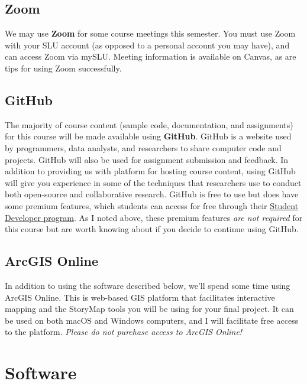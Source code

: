 \documentclass[
]{book}
\begin{document}
\hypertarget{zoom}{%
\subsection{Zoom}\label{zoom}}

We may use \textbf{Zoom} for some course meetings this semester. You must use Zoom with your SLU account (as opposed to a personal account you may have), and can access Zoom via mySLU. Meeting information is available on Canvas, as are tips for using Zoom successfully.

\hypertarget{github}{%
\subsection{GitHub}\label{github}}

The majority of course content (sample code, documentation, and assignments) for this course will be made available using \textbf{GitHub}. GitHub is a website used by programmers, data analysts, and researchers to share computer code and projects. GitHub will also be used for assignment submission and feedback. In addition to providing us with platform for hosting course content, using GitHub will give you experience in some of the techniques that researchers use to conduct both open-source and collaborative research. GitHub is free to use but does have some premium features, which students can access for free through their \href{https://education.github.com/pack/}{Student Developer program}. As I noted above, these premium features \emph{are not required} for this course but are worth knowing about if you decide to continue using GitHub.

\hypertarget{arcgis-online}{%
\subsection{ArcGIS Online}\label{arcgis-online}}

In addition to using the software described below, we'll spend some time using ArcGIS Online. This is web-based GIS platform that facilitates interactive mapping and the StoryMap tools you will be using for your final project. It can be used on both macOS and Windows computers, and I will facilitate free access to the platform. \emph{Please do not purchase access to ArcGIS Online!}

\hypertarget{software}{%
\section{Software}\label{software}}
\end{document}
